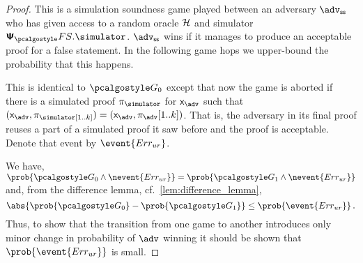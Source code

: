 \documentclass[runningheads,10pt]{llncs}
\begin{document}
\begin{proof}



   This is a simulation soundness game played between an adversary
  $\advss$ who has given access to a random oracle $\mathcal{H}$ and simulator
  $\psfs.\simulator$. $\advss$ wins if it manages to produce an acceptable proof
  for a false statement. In the following game hops we upper-bound the
  probability that this happens.

   This is identical to $\game{0}$ except that now the game is aborted
  if there is a simulated proof $\zkproof_\simulator$ for $\inp_{\adv}$ such
  that $(\inp_{\adv}, \zkproof_\simulator[1..k]) = (\inp_{\adv},
  \zkproof_{\adv}[1..k])$. That is, the adversary in its final proof
  reuses a part of a simulated proof it saw before and the proof is acceptable.
  Denote that event by $\event{\errur}$.

   We have, \( \prob{\game{0} \land
    \nevent{\errur}} = \prob{\game{1} \land \nevent{\errur}} \) and, from the
  difference lemma, cf.~\cref{lem:difference_lemma},
  \[ \abs{\prob{\game{0}} - \prob{\game{1}}} \leq \prob{\event{\errur}}\,. \]
  Thus, to show that the transition from one game to another introduces only
  minor change in probability of $\adv$ winning it should be shown that
  $\prob{\event{\errur}}$ is small.


\end{proof}
\end{document}
